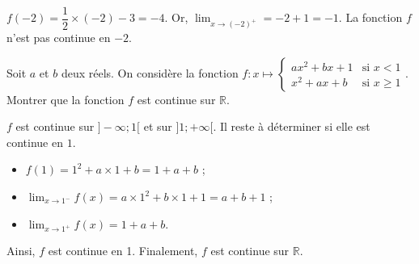 \documentclass[11pt,fleqn, openany]{book} %
\begin{document}
\begin{solution}$f(-2)=\dfrac{1}{2}\times(-2)-3=-4$. Or, $\displaystyle\lim_{x \to (-2)^+}=-2+1=-1$. La fonction $f$ n'est pas continue en $-2$.


\begin{center}


\end{center}
\end{solution}




\begin{exercise}[topic=cont01]
Soit $a$ et $b$ deux réels. On considère la fonction \renewcommand{\arraystretch}{1}$f:x\mapsto \left\{ \begin{array}{ll} ax^2+bx+1 & \text{si } x<1 \\ x^2+ax+b & \text{si } x\geqslant 1 \end{array}\right.$.\\
Montrer que la fonction $f$ est continue sur $\mathbb{R}$.\end{exercise}
\begin{solution}
 $f$ est continue sur $]-\infty;1[$ et sur $]1;+\infty[$. Il reste à déterminer si elle est continue en $1$.
 \begin{itemize}
 \item $f(1)=1^2+a \times 1+b=1+a+b$ ;
 \item $\displaystyle\lim_{x \to 1^-} f(x)= a \times 1^2 + b \times 1 + 1 = a +b+1$ ;
 \item $\displaystyle\lim_{x \to 1^+} f(x)=1+a+b$.
 \end{itemize}
 Ainsi, $f$ est continue en 1. Finalement, $f$ est continue sur $\mathbb{R}$.\end{solution}
 
 
\end{document}
